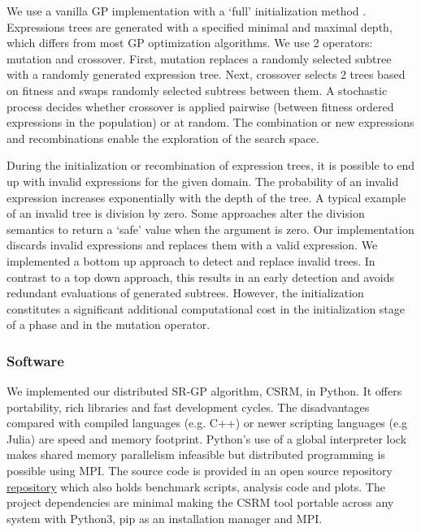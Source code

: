 We use a vanilla GP implementation with a `full' initialization method \cite{GP}. Expressions trees are generated with a specified minimal and maximal depth, which differs from most GP optimization algorithms. 
We use 2 operators: mutation and crossover. First, mutation replaces a randomly selected subtree with a randomly generated expression tree. Next, crossover selects 2 trees based on fitness and swaps randomly selected subtrees between them. A stochastic process decides whether crossover is applied pairwise (between fitness ordered expressions in the population) or at random. The combination or new expressions and recombinations enable the exploration of the search space. 

During the initialization or recombination of expression trees, it is possible to end up with invalid expressions for the given domain. The probability of an invalid expression increases exponentially with the depth of the tree. A typical example of an invalid tree is division by zero. Some approaches alter the division semantics to return a `safe' value when the argument is zero. Our implementation discards invalid expressions and replaces them with a valid expression. We implemented a bottom up approach to detect and replace invalid trees. In contrast to a top down approach, this results in an early detection and avoids redundant evaluations of generated subtrees. However, the initialization constitutes a significant additional computational cost in the initialization stage of a phase and in the mutation operator.

\subsubsection{Software}
We implemented our distributed SR-GP algorithm, CSRM, in Python. It offers portability, rich libraries and fast development cycles. The disadvantages compared with compiled languages (e.g. C++) or newer scripting languages (e.g Julia) are speed and memory footprint.
Python's use of a global interpreter lock makes shared memory parallelism infeasible but distributed programming is possible using MPI.
The source code is provided in an open source repository \href{https://bitbucket.org/bcardoen/csrm}{repository} which also holds benchmark scripts, analysis code and plots. 
The project dependencies are minimal making the CSRM tool portable across any system with Python3, pip as an installation manager and MPI.


